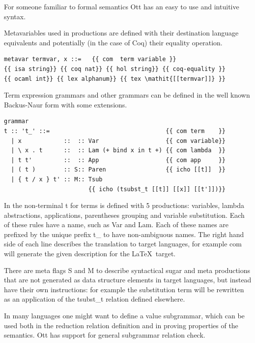 \documentclass[12pt,twoside,notitlepage]{report}
\theoremstyle{plain}%
\theoremstyle{definition}
\theoremstyle{remark}
\begin{document}
For someone familiar to formal semantics Ott has an easy to use and intuitive syntax. 

Metavariables used in productions are defined with their destination language equivalents and potentially (in the case of Coq) their equality operation.

\begin{lstlisting}[language={Ott}, caption={Ott metavariable definition}]
metavar termvar, x ::=   {{ com  term variable }} 
{{ isa string}} {{ coq nat}} {{ hol string}} {{ coq-equality }}
{{ ocaml int}} {{ lex alphanum}} {{ tex \mathit{[[termvar]]} }}
\end{lstlisting}


Term expression grammars and other grammars can be defined in the well known Backus-Naur form with some extensions.


\begin{lstlisting}[language={Ott}, caption={Ott grammar example}, label={lst:ottgrammarex}]
grammar
t :: 't_' ::=                                 {{ com term    }}
  | x            ::  :: Var                   {{ com variable}}
  | \ x . t      ::  :: Lam (+ bind x in t +) {{ com lambda  }}
  | t t'         ::  :: App                   {{ com app     }}
  | ( t )        :: S:: Paren                 {{ icho [[t]]  }} 
  | { t / x } t' :: M:: Tsub  
                        {{ icho (tsubst_t [[t]] [[x]] [[t']])}}
\end{lstlisting}


In  the non-terminal t for terms is defined with 5 productions: variables, lambda abstractions, applications, parentheses grouping and variable substitution. Each of these rules have a name, such as Var and Lam. Each of these names are prefixed by the unique prefix t\_ to have non-ambiguous names. The right hand side of each line describes the translation to target languages, for example com will  generate the given description for the \LaTeX\, target. 

There are meta flags S and M to describe syntactical sugar and meta productions that are not generated as data structure elements in target languages, but instead have their own instructions: for example the substitution term will be rewritten as an application of the tsubst\_t relation defined elsewhere. 

In many languages one might want to define a value subgrammar, which can be used both in the reduction relation definition and in proving properties of the semantics. Ott has support for general subgrammar relation check.
\end{document}
